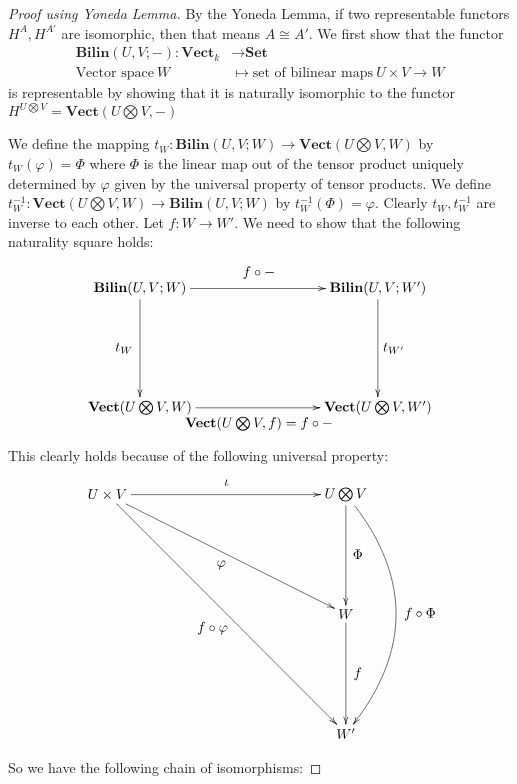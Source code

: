 \documentclass[11pt]{article}
\theoremstyle{definition}
\theoremstyle{plain}
\theoremstyle{plain}
\theoremstyle{plain}
\theoremstyle{definition}
\begin{document}
\begin{proof}[Proof using Yoneda Lemma]
By the Yoneda Lemma, if two representable functors $H^A, H^{A'}$ are isomorphic, then that means $A \cong A'$. We first show that the functor
\begin{align*}
\textbf{Bilin}(U, V; -): \textbf{Vect}_k &\to \textbf{Set} \\
\text{Vector space} \  W &\mapsto \text{set of bilinear maps} \  U \times V \to W
\end{align*}
is representable by showing that it is naturally isomorphic to the functor $H^{U \bigotimes V} = \textbf{Vect}(U \bigotimes V, -)$

We define the mapping $t_W: \textbf{Bilin}(U,V; W) \to \textbf{Vect}(U \bigotimes V, W)$ by $t_W(\varphi) = \Phi$ where $\Phi$ is the linear map out of the tensor product uniquely determined by $\varphi$ given by the universal property of tensor products. We define $t_W^{-1}: \textbf{Vect}(U \bigotimes V, W) \to \textbf{Bilin}(U,V; W)$  by $t_W^{-1}(\Phi) = \varphi$. Clearly $t_W, t_W^{-1}$ are inverse to each other. Let $f: W \to W'$. We need to show that the following naturality square holds:

\begin{equation*}
\begin{xy}
(0,0)*+{\textbf{Bilin}(U,V;W)}="v1"; (60,0)*+{\textbf{Bilin}(U,V;W')}="v2"; (0,-30)*+{\textbf{Vect}(U \bigotimes V, W)}="v3"; (60,-30)*+{\textbf{Vect}(U \bigotimes V, W')}="v4";
{\ar "v1";"v2"}?*!/_4mm/{f \circ -};
{\ar "v1";"v3"}?*!/^4mm/{t_W};
{\ar "v2";"v4"}?*!/_4mm/{t_{W'}};
{\ar "v3";"v4"}?*!/^4mm/{\textbf{Vect}(U \bigotimes V, f) = f \circ -};
\end{xy}
\end{equation*}

This clearly holds because of the following universal property:

\begin{equation*}
\begin{xy}
(0,0)*+{U \times V}="v1"; (60,0)*+{U \bigotimes V}="v2"; (60, -30)*+{W}="v3"; (60, -60)*+{W'}="v4";
{\ar "v1";"v2"}?*!/_3mm/{\iota};
{\ar "v2";"v3"}?*!/_3mm/{\Phi};
{\ar "v1";"v3"}?*!/^3mm/{\varphi};
{\ar "v3";"v4"}?*!/_3mm/{f};
{\ar "v1";"v4"}?*!/^5mm/{f \circ \varphi};
{\ar@/^3pc/ "v2";"v4"}?*!/_6mm/{f \circ \Phi};
\end{xy}
\end{equation*}

So we have the following chain of isomorphisms:


\end{proof}
\end{document}
